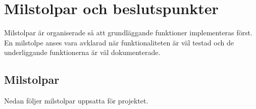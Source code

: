 \section{Milstolpar och beslutspunkter}
Milstolpar är organiserade så att grundläggande funktioner implementeras först. En milstolpe anses vara avklarad när funktionaliteten är väl testad och de underliggande funktionerna är väl dokumenterade.

\subsection{Milstolpar}
Nedan följer milstolpar uppsatta för projektet.
\begin{LIPSmilstolpar}

\end{LIPSmilstolpar}

